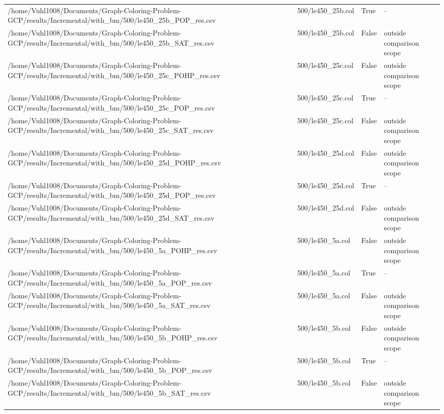 \begin{table}[htbp]
\begin{tabular}{llll}
/home/Vuhl1008/Documents/Graph-Coloring-Problem-GCP/results/Incremental/with\_bm/500/le450\_25b\_POP\_res.csv & 500/le450\_25b.col & True & -- \\
/home/Vuhl1008/Documents/Graph-Coloring-Problem-GCP/results/Incremental/with\_bm/500/le450\_25b\_SAT\_res.csv & 500/le450\_25b.col & False & outside comparison scope \\
/home/Vuhl1008/Documents/Graph-Coloring-Problem-GCP/results/Incremental/with\_bm/500/le450\_25c\_POHP\_res.csv & 500/le450\_25c.col & False & outside comparison scope \\
/home/Vuhl1008/Documents/Graph-Coloring-Problem-GCP/results/Incremental/with\_bm/500/le450\_25c\_POP\_res.csv & 500/le450\_25c.col & True & -- \\
/home/Vuhl1008/Documents/Graph-Coloring-Problem-GCP/results/Incremental/with\_bm/500/le450\_25c\_SAT\_res.csv & 500/le450\_25c.col & False & outside comparison scope \\
/home/Vuhl1008/Documents/Graph-Coloring-Problem-GCP/results/Incremental/with\_bm/500/le450\_25d\_POHP\_res.csv & 500/le450\_25d.col & False & outside comparison scope \\
/home/Vuhl1008/Documents/Graph-Coloring-Problem-GCP/results/Incremental/with\_bm/500/le450\_25d\_POP\_res.csv & 500/le450\_25d.col & True & -- \\
/home/Vuhl1008/Documents/Graph-Coloring-Problem-GCP/results/Incremental/with\_bm/500/le450\_25d\_SAT\_res.csv & 500/le450\_25d.col & False & outside comparison scope \\
/home/Vuhl1008/Documents/Graph-Coloring-Problem-GCP/results/Incremental/with\_bm/500/le450\_5a\_POHP\_res.csv & 500/le450\_5a.col & False & outside comparison scope \\
/home/Vuhl1008/Documents/Graph-Coloring-Problem-GCP/results/Incremental/with\_bm/500/le450\_5a\_POP\_res.csv & 500/le450\_5a.col & True & -- \\
/home/Vuhl1008/Documents/Graph-Coloring-Problem-GCP/results/Incremental/with\_bm/500/le450\_5a\_SAT\_res.csv & 500/le450\_5a.col & False & outside comparison scope \\
/home/Vuhl1008/Documents/Graph-Coloring-Problem-GCP/results/Incremental/with\_bm/500/le450\_5b\_POHP\_res.csv & 500/le450\_5b.col & False & outside comparison scope \\
/home/Vuhl1008/Documents/Graph-Coloring-Problem-GCP/results/Incremental/with\_bm/500/le450\_5b\_POP\_res.csv & 500/le450\_5b.col & True & -- \\
/home/Vuhl1008/Documents/Graph-Coloring-Problem-GCP/results/Incremental/with\_bm/500/le450\_5b\_SAT\_res.csv & 500/le450\_5b.col & False & outside comparison scope \\

\end{tabular}
\end{table}
